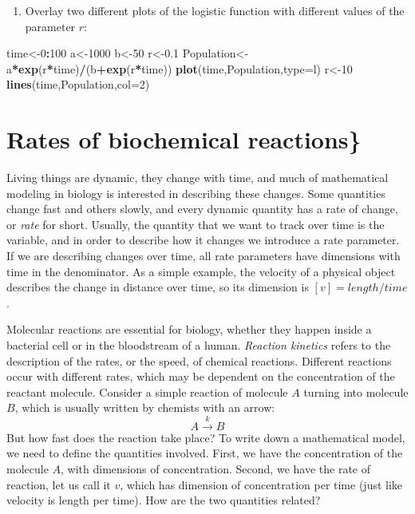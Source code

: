 \documentclass[
]{book}
\newenvironment{Shaded}{\begin{snugshade}}{\end{snugshade}}
\newcommand{\DataTypeTok}[1]{\textcolor[rgb]{0.13,0.29,0.53}{#1}}
\newcommand{\DecValTok}[1]{\textcolor[rgb]{0.00,0.00,0.81}{#1}}
\newcommand{\FloatTok}[1]{\textcolor[rgb]{0.00,0.00,0.81}{#1}}
\newcommand{\KeywordTok}[1]{\textcolor[rgb]{0.13,0.29,0.53}{\textbf{#1}}}
\newcommand{\NormalTok}[1]{#1}
\newcommand{\OperatorTok}[1]{\textcolor[rgb]{0.81,0.36,0.00}{\textbf{#1}}}
\newcommand{\StringTok}[1]{\textcolor[rgb]{0.31,0.60,0.02}{#1}}
\providecommand{\tightlist}{%
  \setlength{\itemsep}{0pt}\setlength{\parskip}{0pt}}
\begin{document}
\begin{enumerate}
\def\labelenumi{\arabic{enumi}.}
\setcounter{enumi}{5}
\tightlist
\item
  Overlay two different plots of the logistic function with different values of the parameter \(r\):
\end{enumerate}

\begin{Shaded}
\begin{Highlighting}[]
\NormalTok{time\textless{}{-}}\DecValTok{0}\OperatorTok{:}\DecValTok{100}
\NormalTok{a\textless{}{-}}\DecValTok{1000}
\NormalTok{b\textless{}{-}}\DecValTok{50} 
\NormalTok{r\textless{}{-}}\FloatTok{0.1}
\NormalTok{Population\textless{}{-}a}\OperatorTok{*}\KeywordTok{exp}\NormalTok{(r}\OperatorTok{*}\NormalTok{time)}\OperatorTok{/}\NormalTok{(b}\OperatorTok{+}\KeywordTok{exp}\NormalTok{(r}\OperatorTok{*}\NormalTok{time)) }
\KeywordTok{plot}\NormalTok{(time,Population,}\DataTypeTok{type=}\StringTok{\textquotesingle{}l\textquotesingle{}}\NormalTok{) }
\NormalTok{r\textless{}{-}}\DecValTok{10} 
\KeywordTok{lines}\NormalTok{(time,Population,}\DataTypeTok{col=}\DecValTok{2}\NormalTok{)}
\end{Highlighting}
\end{Shaded}

\hypertarget{rates-of-biochemical-reactions}{%
\section{Rates of biochemical reactions\}}\label{rates-of-biochemical-reactions}}

\label{sec:bio2}

Living things are dynamic, they change with time, and much of mathematical modeling in biology is interested in describing these changes. Some quantities change fast and others slowly, and every dynamic quantity has a rate of change, or \emph{rate} for short. Usually, the quantity that we want to track over time is the variable, and in order to describe how it changes we introduce a rate parameter. If we are describing changes over time, all rate parameters have dimensions with time in the denominator. As a simple example, the velocity of a physical object describes the change in distance over time, so its dimension is \([v] = length/time\).

Molecular reactions are essential for biology, whether they happen inside a bacterial cell or in the bloodstream of a human. \emph{Reaction kinetics}  refers to the description of the rates, or the speed, of chemical reactions. Different reactions occur with different rates, which may be dependent on the concentration of the reactant molecule. Consider a simple reaction of molecule \(A\) turning into molecule \(B\), which is usually written by chemists with an arrow:
\[
  A \xrightarrow{k} B
\]
But how fast does the reaction take place? To write down a mathematical model, we need to define the quantities involved. First, we have the concentration of the molecule \(A\), with dimensions of concentration. Second, we have the rate of reaction, let us call it \(v\), which has dimension of concentration per time (just like velocity is length per time). How are the two quantities related?
\end{document}
